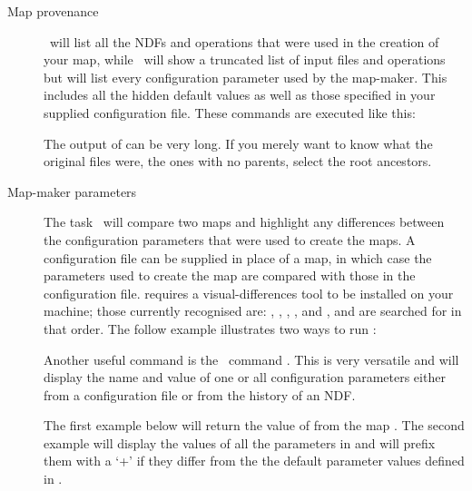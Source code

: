 \begin{description}
\item[Map provenance]
  \provshow\ will list all the NDFs and operations that were used in the
  creation of your map, while \hislist\ will show a truncated list of input
  files and operations but will list every configuration parameter used by
  the map-maker.  This includes all the hidden default values as well as
  those specified in your supplied configuration file. These commands are
  executed like this:

\begin{terminalv}
\end{terminalv}

The output of  can be very long.  If you merely want to
know what the original files were, the ones with no parents, select the
root ancestors.

\begin{terminalv}
\end{terminalv}


\item[Map-maker parameters]
The task \configmeld\ will compare two maps and highlight any differences
between the configuration parameters that were used to create the maps. A
configuration file can be supplied in place of a map, in which case the
parameters used to create the map are compared with those in the
configuration file.  requires a visual-differences tool
to be installed on your machine; those currently recognised are:
,
,
,
, and
,
and are searched for in that order. The follow example illustrates two
ways to run :

\begin{terminalv}
\end{terminalv}

Another useful command is the \Kappa\ command \configecho.
This is very versatile and will display the name and value of one or
all configuration parameters either from a configuration file or from
the history of an NDF.

The first example below will return the value of  from
the map . The second example will display the values of all
the parameters in  and will prefix them with a `+' if they
differ from the the default parameter values defined in .

\begin{terminalv}
\end{terminalv}
\end{description}



